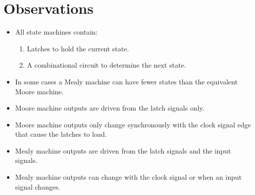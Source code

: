 \documentclass[10pt,letterpaper]{article}
\begin{document}

\FloatBarrier
\newpage

\section{Observations}

\begin{itemize}
\item All state machines contain:
	\begin{enumerate}
	\item Latches to hold the current state.
	\item A combinational circuit to determine the next state.
	\end{enumerate}
\item In some cases a Mealy machine can have fewer states than the equivalent Moore machine.
\item Moore machine outputs are driven from the latch signals only.
\item Moore machine outputs only change synchronously with the clock signal 
	edge that cause the latches to load.
\item Mealy machine outputs are driven from the latch signals and the input signals.
\item Mealy machine outputs can change with the clock signal or when an 
	input signal changes.
\end{itemize}
\end{document}
